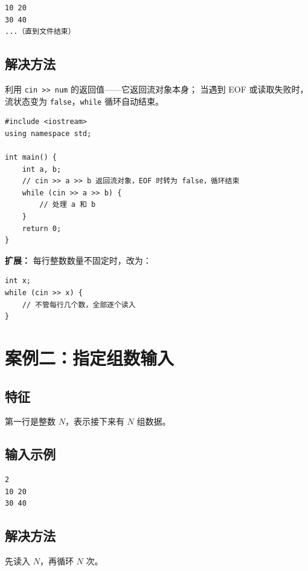 \documentclass[12pt, a4paper]{article}
\begin{document}
\begin{lstlisting}[style=input]
10 20
30 40
...（直到文件结束）
\end{lstlisting}

\subsection{解决方法}

利用 \texttt{cin >> num} 的返回值——它返回流对象本身；
当遇到 EOF 或读取失败时，流状态变为 \texttt{false}，\texttt{while} 循环自动结束。

\begin{lstlisting}[style=cpp]
#include <iostream>
using namespace std;

int main() {
    int a, b;
    // cin >> a >> b 返回流对象，EOF 时转为 false，循环结束
    while (cin >> a >> b) {
        // 处理 a 和 b
    }
    return 0;
}
\end{lstlisting}

\textbf{扩展：} 每行整数数量不固定时，改为：

\begin{lstlisting}[style=cpp]
int x;
while (cin >> x) {
    // 不管每行几个数，全部逐个读入
}
\end{lstlisting}

\section{案例二：指定组数输入}

\subsection{特征}

第一行是整数 $N$，表示接下来有 $N$ 组数据。

\subsection{输入示例}

\begin{lstlisting}[style=input]
2
10 20
30 40
\end{lstlisting}

\subsection{解决方法}

先读入 $N$，再循环 $N$ 次。
\end{document}
